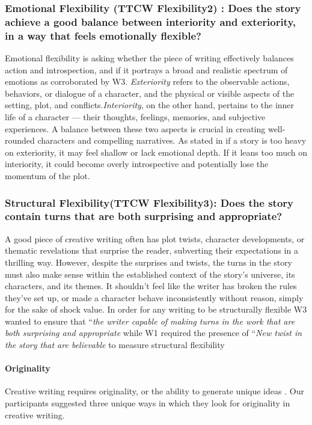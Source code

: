 \subsubsection{\textbf{{\color{blue}Emotional Flexibility (TTCW Flexibility2)} : Does the story achieve a good balance between interiority and exteriority, in a way that feels emotionally flexible?}}
Emotional flexibility is asking whether the piece of writing effectively balances action and introspection, and if it portrays a broad and realistic spectrum of emotions as corroborated by W3. \textit{Exteriority} refers to the observable actions, behaviors, or dialogue of a character, and the physical or visible aspects of the setting, plot, and conflicts.\textit{Interiority}, on the other hand, pertains to the inner life of a character — their thoughts, feelings, memories, and subjective experiences. A balance between these two aspects is crucial in creating well-rounded characters and compelling narratives. As stated in \citet{campe2014rethinking} if a story is too heavy on exteriority, it may feel shallow or lack emotional depth. If it leans too much on interiority, it could become overly introspective and potentially lose the momentum of the plot.
\subsubsection{\textbf{{\color{blue} Structural Flexibility(TTCW Flexibility3)}: Does the story contain turns that are both surprising and appropriate?}} A good piece of creative writing often has plot twists, character developments, or thematic revelations that surprise the reader, subverting their expectations in a thrilling way. However, despite the surprises and twists, the turns in the story must also make sense within the established context of the story's universe, its characters, and its themes. It shouldn't feel like the writer has broken the rules they've set up, or made a character behave inconsistently without reason, simply for the sake of shock value. In order for any writing to be structurally flexible W3 wanted to ensure that ``\textit{the writer capable of making turns in the work that are both surprising and appropriate} while W1 required the presence of ``\textit{New twist in the story that are believable} to measure structural flexibility
\paragraph{\textbf{{Originality}}} Creative writing requires originality, or the ability to generate unique ideas \cite{ward1999creative}.
Our participants suggested three unique ways in which they look for originality in creative writing.

